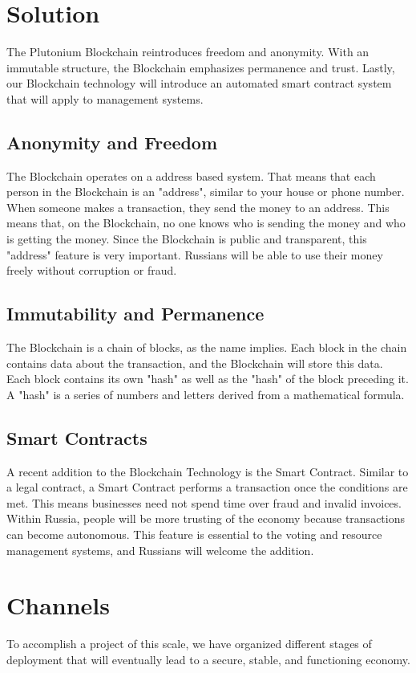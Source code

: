 \documentclass[12pt]{article}
\begin{document}
\section{Solution}
The Plutonium Blockchain reintroduces freedom and anonymity. With an immutable structure, the Blockchain emphasizes permanence and trust. Lastly, our Blockchain technology will introduce an automated smart contract system that will apply to management systems.
\subsection{Anonymity and Freedom}
The Blockchain operates on a address based system. That means that each person in the Blockchain is an "address", similar to your house or phone number. When someone makes a transaction, they send the money to an address. This means that, on the Blockchain, no one knows who is sending the money and who is getting the money. Since the Blockchain is public and transparent, this "address" feature is very important. Russians will be able to use their money freely without corruption or fraud.
\subsection{Immutability and Permanence}
The Blockchain is a chain of blocks, as the name implies. Each block in the chain contains data about the transaction, and the Blockchain will store this data. Each block contains its own "hash" as well as the "hash" of the block preceding it. A "hash" is a series of numbers and letters derived from a mathematical formula. 
\subsection{Smart Contracts}
A recent addition to the Blockchain Technology is the Smart Contract. Similar to a legal contract, a Smart Contract performs a transaction once the conditions are met. This means businesses need not spend time over fraud and invalid invoices. Within Russia, people will be more trusting of the economy because transactions can become autonomous. This feature is essential to the voting and resource management systems, and Russians will welcome the addition.
\pagebreak
\section{Channels}
To accomplish a project of this scale, we have organized different stages of deployment that will eventually lead to a secure, stable, and functioning economy.
\end{document}

